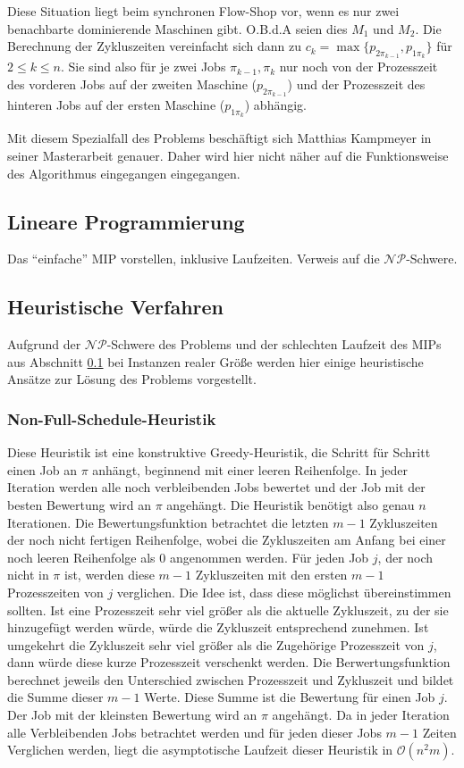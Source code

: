 \documentclass{scrreprt}
\begin{document}
Diese Situation liegt beim synchronen Flow-Shop vor, wenn es nur zwei benachbarte dominierende Maschinen gibt. O.B.d.A seien dies $M_1$ und $M_2$.
Die Berechnung der Zykluszeiten vereinfacht sich dann zu
$c_k = \max \{p_{2\pi_{k-1}},p_{1\pi_k}\}$ für $2\leq k\leq n$.
Sie sind also für je zwei Jobs $\pi_{k-1},\pi_{k}$ nur noch von der Prozesszeit des vorderen Jobs auf der zweiten Maschine ($p_{2\pi_{k-1}}$) 
und der Prozesszeit des hinteren Jobs auf der ersten Maschine ($p_{1\pi_k}$) abhängig.

Mit diesem Spezialfall des Problems beschäftigt sich Matthias Kampmeyer in seiner Masterarbeit genauer.
Daher wird hier nicht näher auf die Funktionsweise des Algorithmus eingegangen eingegangen.


\subsection{Lineare Programmierung}
\label{subsec:LineareProgrammierung}
Das "`einfache"' MIP vorstellen, inklusive Laufzeiten.
Verweis auf die $\mathcal{NP}$-Schwere.


\subsection{Heuristische Verfahren}
Aufgrund der $\mathcal{NP}$-Schwere des Problems und der schlechten Laufzeit des MIPs aus Abschnitt \ref{subsec:LineareProgrammierung}
bei Instanzen realer Größe werden hier einige heuristische Ansätze zur Lösung des Problems vorgestellt.

\subsubsection{Non-Full-Schedule-Heuristik}
Diese Heuristik ist eine konstruktive Greedy-Heuristik, die Schritt für Schritt einen Job an $\pi$ anhängt, beginnend mit einer leeren Reihenfolge.
In jeder Iteration werden alle noch verbleibenden Jobs bewertet und der Job mit der besten Bewertung wird an $\pi$ angehängt.
Die Heuristik benötigt also genau $n$ Iterationen.
Die Bewertungsfunktion betrachtet die letzten $m-1$ Zykluszeiten der noch nicht fertigen Reihenfolge, 
wobei die Zykluszeiten am Anfang bei einer noch leeren Reihenfolge als $0$ angenommen werden.
Für jeden Job $j$, der noch nicht in $\pi$ ist, werden diese $m-1$ Zykluszeiten mit den ersten $m-1$ Prozesszeiten von $j$ verglichen.
Die Idee ist, dass diese möglichst übereinstimmen sollten. Ist eine Prozesszeit sehr viel größer als die aktuelle Zykluszeit,
zu der sie hinzugefügt werden würde, würde die Zykluszeit entsprechend zunehmen.
Ist umgekehrt die Zykluszeit sehr viel größer als die Zugehörige Prozesszeit von $j$, dann würde diese kurze Prozesszeit verschenkt werden.
Die Berwertungsfunktion berechnet jeweils den Unterschied zwischen Prozesszeit und Zykluszeit und bildet die Summe dieser $m-1$ Werte.
Diese Summe ist die Bewertung für einen Job $j$. Der Job mit der kleinsten Bewertung wird an $\pi$ angehängt.
Da in jeder Iteration alle Verbleibenden Jobs betrachtet werden und für jeden dieser Jobs $m-1$ Zeiten Verglichen werden,
liegt die asymptotische Laufzeit dieser Heuristik in $\mathcal{O}(n^2m)$.
\end{document}
